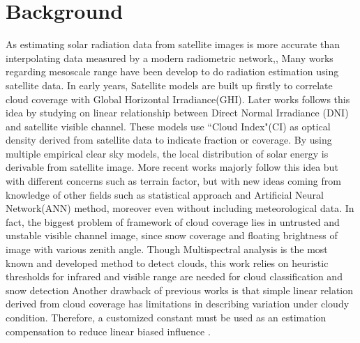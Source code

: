\documentclass[conference]{IEEEtran}
\begin{document}

\section{Background}
\label{sec:bg}

As estimating solar radiation data from satellite images is more accurate than
interpolating data measured by a modern radiometric network,\cite{zelenka1999effective}, 
Many works regarding mesoscale range have been develop to do radiation
estimation using satellite data. In early years, Satellite models are built up firstly
to correlate cloud coverage with Global Horizontal
Irradiance(GHI)\cite{cano1986method,stuhlmann1990improvement,schmetz1989towards}.
Later works follows this idea by studying on linear relationship between Direct
Normal Irradiance (DNI) and satellite visible
channel\cite{ineichen1999derivation,hammer2003solar}. These
models use ``Cloud Index"(CI) as optical density derived from satellite data to
indicate fraction or coverage. By using multiple empirical clear sky models,
the local distribution of solar energy is derivable from satellite
image\cite{janjai2005development,martins2007satellite}. More recent
works majorly follow this idea but with different concerns such as terrain
factor\cite{perez2004producing}, but with new ideas coming from knowledge of
other fields such as statistical approach\cite{zarzalejo2009new} and
Artificial Neural Network(ANN) method\cite{zarzalejo2005artificial,csenkal2009estimation},
moreover even without including meteorological data\cite{csenkal2010modeling}.
In fact, the biggest problem of framework of cloud coverage lies in untrusted and unstable visible channel image, since snow coverage and floating brightness of image with various zenith angle. Though Multispectral analysis is the most known and developed
method to detect clouds, this work relies on heuristic thresholds for infrared
and visible range are needed for cloud
classification\cite{ricciardelli2008physical} and snow
detection\cite{perez2010improving} Another drawback of previous works is that simple linear relation derived from cloud coverage has limitations in describing
variation under cloudy condition. Therefore, a customized constant must be
used as an estimation compensation to reduce linear biased influence
\cite{perez2002new}.
\end{document}
